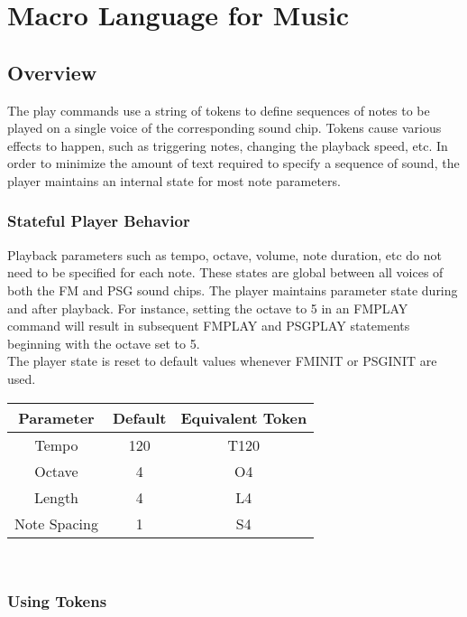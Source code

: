 \chapter*{Macro Language for Music}

\section{Overview}

The play commands use a string of tokens to define sequences of notes to be
played on a single voice of the corresponding sound chip. Tokens cause various
effects to happen, such as triggering notes, changing the playback speed, etc.
In order to minimize the amount of text required to specify a sequence of
sound, the player maintains an internal state for most note parameters.

\subsection{Stateful Player Behavior}

Playback parameters such as tempo, octave, volume, note duration, etc do not
need to be specified for each note. These states are global between all voices
of both the FM and PSG sound chips. The player maintains parameter state during
and after playback. For instance, setting the octave to 5 in an {\ttfamily
FMPLAY} command will result in subsequent {\ttfamily FMPLAY} and {\ttfamily
PSGPLAY} statements beginning with the octave set to 5.\\

The player state is reset to default values whenever {\ttfamily FMINIT} or
{\ttfamily PSGINIT} are used.\\

\begin{tabular}{|c|c|c|}
	\hline
	Parameter & Default & Equivalent Token \\ \hline
	Tempo & 120 & T120 \\ \hline
	Octave & 4 & O4 \\ \hline
	Length & 4 & L4 \\ \hline
	Note Spacing & 1 & S4 \\ \hline
\end{tabular}\\

\subsection{Using Tokens}

